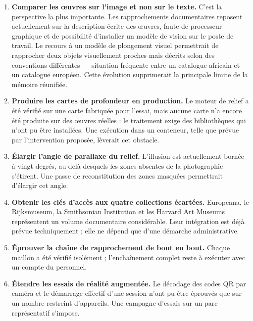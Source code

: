 \begin{enumerate}
  \item \textbf{Comparer les œuvres sur l'image et non sur le texte.} C'est la
        perspective la plus importante. Les rapprochements documentaires
        reposent actuellement sur la description écrite des œuvres, faute de
        processeur graphique et de possibilité d'installer un modèle de vision
        sur le poste de travail. Le recours à un modèle de plongement visuel
        permettrait de rapprocher deux objets visuellement proches mais décrits
        selon des conventions différentes — situation fréquente entre un
        catalogue africain et un catalogue européen. Cette évolution supprimerait
        la principale limite de la mémoire réunifiée.

  \item \textbf{Produire les cartes de profondeur en production.} Le moteur de
        relief a été vérifié sur une carte fabriquée pour l'essai, mais aucune
        carte n'a encore été produite sur des œuvres réelles : le traitement
        exige des bibliothèques qui n'ont pu être installées. Une exécution dans
        un conteneur, telle que prévue par l'intervention proposée, lèverait cet
        obstacle.

  \item \textbf{Élargir l'angle de parallaxe du relief.} L'illusion est
        actuellement bornée à vingt degrés, au-delà desquels les zones absentes
        de la photographie s'étirent. Une passe de reconstitution des zones
        masquées permettrait d'élargir cet angle.

  \item \textbf{Obtenir les clés d'accès aux quatre collections écartées.}
        Europeana, le Rijksmuseum, la Smithsonian Institution et les Harvard Art
        Museums représentent un volume documentaire considérable. Leur
        intégration est déjà prévue techniquement ; elle ne dépend que d'une
        démarche administrative.

  \item \textbf{Éprouver la chaîne de rapprochement de bout en bout.} Chaque
        maillon a été vérifié isolément ; l'enchaînement complet reste à
        exécuter avec un compte du personnel.

  \item \textbf{Étendre les essais de réalité augmentée.} Le décodage des codes
        QR par caméra et le démarrage effectif d'une session n'ont pu être
        éprouvés que sur un nombre restreint d'appareils. Une campagne d'essais
        sur un parc représentatif s'impose.
\end{enumerate}

